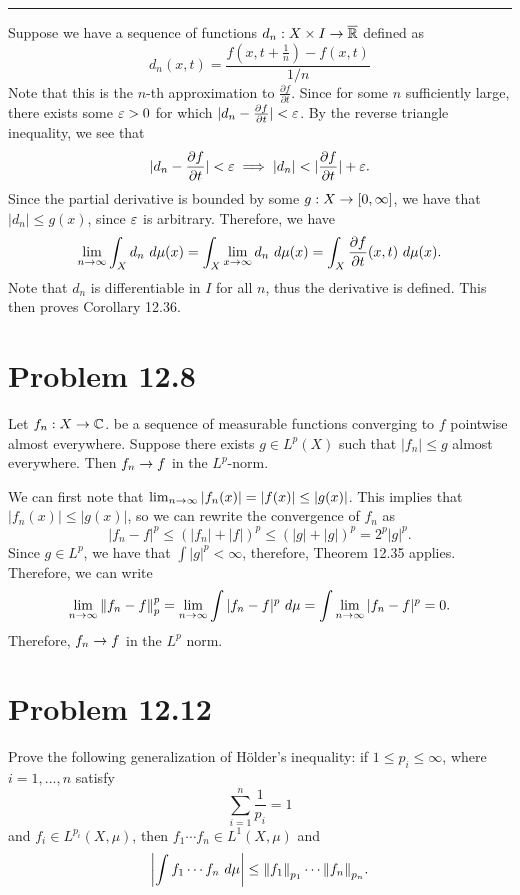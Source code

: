 \begin{solution}
\begin{quote}
        \end{quote}
    \vspace{-10mm}
    \begin{center}\rule{16.5cm}{0.5pt}\end{center}

    \newpage
    Suppose we have a sequence of functions $d_n : X \times I \rightarrow \overline{\mathbb{R}}$ defined as
    \[d_n(x, t) = \frac{f(x, t + \frac{1}{n}) - f(x, t)}{1 / n}\]
    Note that this is the $n$-th approximation to $\frac{\partial f}{\partial t}$. Since for some $n$ sufficiently large, there exists some $\varepsilon > 0$ for which $|d_n - \frac{\partial f}{\partial t}| < \varepsilon$. By the reverse triangle inequality, we see that 
    \[|d_n - \frac{\partial f}{\partial t}| < \varepsilon \implies |d_n| < |\frac{\partial f}{\partial t}| + \varepsilon.\]
    Since the partial derivative is bounded by some $g: X \rightarrow [0, \infty]$, we have that $|d_n| \leq g(x)$, since $\varepsilon$ is arbitrary. Therefore, we have 
    \[\lim_{n \into \infty}\int_X d_n \ d\mu(x) = \int_X \lim_{x \into \infty} d_n \ d\mu(x) = \int_X \frac{\partial f}{\partial t}(x, t) \ d\mu(x).\]
    Note that $d_n$ is differentiable in $I$ for all $n$, thus the derivative is defined. This then proves Corollary 12.36. 
\end{solution}


\newpage
\section{Problem 12.8}
Let $f_n : X \rightarrow \mathbb{C}$. be a sequence of measurable functions converging to $f$ pointwise almost everywhere. Suppose there exists $g \in L^p(X)$ such that $|f_n| \leq g$ almost everywhere. Then $f_n \rightarrow f$ in the $L^p$-norm. 
\partbreak
\begin{solution}

    We can first note that $\lim_{n \rightarrow \infty} |f_n(x)| = |f(x)| \leq |g(x)|$. This implies that $|f_n(x)| \leq |g(x)|$, so we can rewrite the convergence of $f_n$ as
    \[|f_n - f|^p \leq (|f_n| + |f|)^p \leq (|g| + |g|)^p = 2^p|g|^p.\]
    Since $g \in L^p$, we have that $\int |g|^p < \infty$, therefore, Theorem 12.35 applies. Therefore, we can write
    \[\lim_{n \rightarrow \infty} \norm{f_n - f}_p^p = \lim_{n \rightarrow \infty} \int |f_n - f|^p \ d\mu = \int \lim_{n \rightarrow \infty} |f_n - f|^p = 0.\]
    Therefore, $f_n \rightarrow f$ in the $L^p$ norm.
\end{solution}


\newpage
\section{Problem 12.12}
Prove the following generalization of H\"older's inequality: if $1 \leq p_i \leq \infty$, where $i = 1, ..., n$ satisfy
\[\sum_{i = 1}^n \frac{1}{p_i} = 1\]
and $f_i \in L^{p_i}(X, \mu)$, then $f_1 \cdots f_n \in L^1(X, \mu)$ and 
\[\left| \int f_1 \cdots f_n \ d\mu\right| \leq \norm{f_1}_{p_1} \cdots \norm{f_n}_{p_n}.\]



